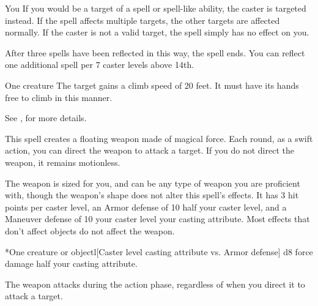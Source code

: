 \begin{spelltarget}{You}
    \spelleffect If you would be a target of a spell or spell-like ability, the caster is targeted instead. If the spell affects multiple targets, the other targets are affected normally. If the caster is not a valid target, the spell simply has no effect on you.

    After three spells have been reflected in this way, the spell ends. You can reflect one additional spell per 7 caster levels above 14th.
\end{spelltarget}

\spelldur{\durmed}
\begin{spelltarget}{One creature}
    \spelleffect The target gains a climb speed of 20 feet. It must have its hands free to climb in this manner.
\end{spelltarget}
\spellnotes See , for more details.

\spellrng{\rngmed}
\spelldur{\durshort \dismissable}
\spellline
\spelleffect This spell creates a floating weapon made of magical force. Each round, as a swift action, you can direct the weapon to attack a target. If you do not direct the weapon, it remains motionless.

The weapon is sized for you, and can be any type of weapon you are proficient with, though the weapon's shape does not alter this spell's effects. It has 3 hit points per caster level, an Armor defense of 10 \add half your caster level, and a Maneuver defense of 10 \add your caster level \add your casting attribute. Most effects that don't affect objects do not affect the weapon.

\begin{spelltarget}*{One creature or object}l[Caster level \add casting attribute vs. Armor defense]
    \spellsuccess d8 force damage \add half your casting attribute.
\end{spelltarget}
\spellnotes The weapon attacks during the action phase, regardless of when you direct it to attack a target.


